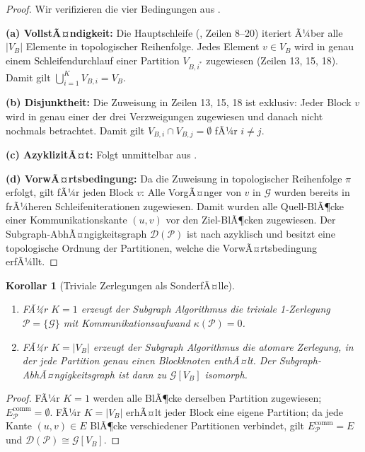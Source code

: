 ﻿\documentclass[12pt,a4paper]{article}
\newtheorem{korollar}[theorem]{Korollar}
\theoremstyle{definition}
\begin{document}
\begin{proof}
Wir verifizieren die vier Bedingungen aus .

\medskip
\textbf{(a) VollstÃ¤ndigkeit:} Die Hauptschleife (,
Zeilen 8--20) iteriert Ã¼ber alle $|V_B|$ Elemente in topologischer
Reihenfolge. Jedes Element $v \in V_B$ wird in genau einem Schleifendurchlauf
einer Partition $V_{B,i^*}$ zugewiesen (Zeilen 13, 15, 18). Damit gilt
$\bigcup_{i=1}^K V_{B,i} = V_B$.

\medskip
\textbf{(b) Disjunktheit:} Die Zuweisung in Zeilen 13, 15, 18 ist exklusiv:
Jeder Block $v$ wird in genau einer der drei Verzweigungen zugewiesen und
danach nicht nochmals betrachtet. Damit gilt $V_{B,i} \cap V_{B,j} = \emptyset$
fÃ¼r $i \neq j$.

\medskip
\textbf{(c) AzyklizitÃ¤t:} Folgt unmittelbar aus .

\medskip
\textbf{(d) VorwÃ¤rtsbedingung:} Da die Zuweisung in topologischer Reihenfolge
$\pi$ erfolgt, gilt fÃ¼r jeden Block $v$: Alle VorgÃ¤nger von $v$ in $\mathcal{G}$
wurden bereits in frÃ¼heren Schleifeniterationen zugewiesen. Damit wurden alle
Quell-BlÃ¶cke einer Kommunikationskante $(u, v)$ vor den Ziel-BlÃ¶cken zugewiesen.
Der Subgraph-AbhÃ¤ngigkeitsgraph $\mathcal{D}(\mathcal{P})$ ist nach
 azyklisch und besitzt eine topologische Ordnung
der Partitionen, welche die VorwÃ¤rtsbedingung erfÃ¼llt.
\end{proof}

\begin{korollar}[Triviale Zerlegungen als SonderfÃ¤lle]
\label{kor:trivial}
\begin{enumerate}[label=(\roman*), nosep]
  \item FÃ¼r $K = 1$ erzeugt der Subgraph Algorithmus die triviale
        1-Zerlegung $\mathcal{P} = \{\mathcal{G}\}$ mit Kommunikationsaufwand
        $\kappa(\mathcal{P}) = 0$.
  \item FÃ¼r $K = |V_B|$ erzeugt der Subgraph Algorithmus die atomare
        Zerlegung, in der jede Partition genau einen Blockknoten enthÃ¤lt.
        Der Subgraph-AbhÃ¤ngigkeitsgraph ist dann zu $\mathcal{G}[V_B]$
        isomorph.
\end{enumerate}
\end{korollar}

\begin{proof}
FÃ¼r $K = 1$ werden alle BlÃ¶cke derselben Partition zugewiesen;
$E_{\mathcal{P}}^{\mathrm{comm}} = \emptyset$. FÃ¼r $K = |V_B|$ erhÃ¤lt
jeder Block eine eigene Partition; da jede Kante $(u,v)\in E$ BlÃ¶cke
verschiedener Partitionen verbindet, gilt
$E_{\mathcal{P}}^{\mathrm{comm}} = E$ und
$\mathcal{D}(\mathcal{P}) \cong \mathcal{G}[V_B]$.
\end{proof}
\end{document}

